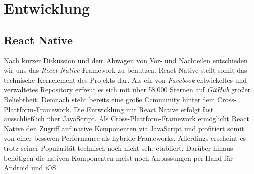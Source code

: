 \chapter{Entwicklung}
\label{entwicklung}


\section{React Native}
Nach kurzer Diskussion und dem Abwägen von Vor- und Nachteilen entschieden wir uns das \emph{React Native} Framework zu benutzen.
React Native stellt somit das technische Kernelement des Projekts dar.
Als ein von \emph{Facebook} entwickeltes und verwaltetes Repository erfreut es sich mit über 58.000 Sternen auf \emph{GitHub} großer Beliebtheit.
Demnach steht bereits eine große Community hinter dem Cross-Plattform-Framework.
Die Entwicklung mit React Native erfolgt fast ausschließlich über JavaScript.
Als Cross-Plattform-Framework ermöglicht React Native den Zugriff auf native Komponenten via JavaScript und profitiert somit von einer besseren Performance als hybride Frameworks.
Allerdings erscheint es trotz seiner Popularität technisch noch nicht sehr etabliert.
Darüber hinaus benötigen die nativen Komponenten meist noch Anpassungen per Hand für Android und iOS.


